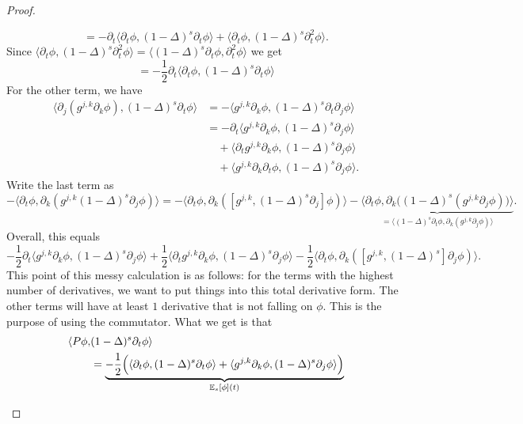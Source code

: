\begin{proof}
\begin{itemize}
\begin{itemize}
\[            = 
            -\partial_t \langle \partial_t \phi, (1-\Delta)^s \partial_t \phi    \rangle + \langle \partial_t \phi, (1-\Delta)^s \partial_t^2 \phi  \rangle . 
        \]
        Since $\langle \partial_t \phi, (1-\Delta)^s \partial_t^2 \phi \rangle = \langle (1-\Delta)^s \partial_t \phi, \partial_t^2 \phi \rangle$ we get 
        \[
            = -\frac{1}{2}\partial_t \langle \partial_t \phi, (1-\Delta)^s \partial_t \phi \rangle 
        \]  
        For the other term, we have 
        \begin{align*}
            \langle \partial_j(g^{j,k}\partial_k\phi), (1-\Delta)^s \partial_t \phi \rangle
            &= 
            - \langle g^{j,k}\partial_k \phi, (1-\Delta)^s \partial_t \partial_j \phi \rangle\\ 
            &= - \partial_t \langle g^{j,k}\partial_k \phi, (1-\Delta)^s \partial_j \phi \rangle  \\ 
            &\quad + \langle \partial_tg^{j,k}\partial_k \phi, (1-\Delta)^s \partial_j \phi \rangle   \\ 
            &\quad + \langle g^{j,k}\partial_k \partial_t \phi, (1-\Delta)^s \partial_j \phi \rangle. 
        \end{align*}
        Write the last term as 
        \[
            - \langle \partial_t \phi, \partial_k (g^{j,k}(1-\Delta)^s \partial_j \phi) \rangle  
            = 
            - \langle \partial_t \phi, \partial_k([g^{j,k}, (1-\Delta)^s \partial_j] \phi) \rangle  
            - 
            \underbrace{\langle \partial_t \phi, \partial_k \big( (1-\Delta)^s (g^{j,k}\partial_{j} \phi) \big) \rangle }_{= \langle (1-\Delta)^s \partial_t \phi, \partial_k (g^{j,k}\partial_j\phi) \rangle }. 
        \]
        Overall, this equals 
        \[
            -\frac{1}{2}\partial_t \langle g^{j,k}\partial_k \phi, (1-\Delta)^s \partial_j \phi \rangle + \frac{1}{2} \langle \partial_t g^{j,k}\partial_k \phi, (1-\Delta)^s \partial_j \phi \rangle - \frac{1}{2} \langle \partial_t \phi, \partial_k ([g^{j,k}, (1-\Delta)^s]\partial_j \phi) \rangle.   
        \]
        This point of this messy calculation is as follows: for the terms with the highest number of derivatives, we want to put things into this total derivative form. The other terms will have at least $1$ derivative that is not falling on $\phi$. This is the purpose of using the commutator. What we get is that 
        \begin{align*}
            \langle P \phi, &(1-\Delta)^s \partial_t \phi \rangle \\ 
            & = \underbrace{-\frac{1}{2}\Big( \langle \partial_t \phi, (1-\Delta)^s \partial_t \phi \rangle + \langle g^{j,k}\partial_k \phi, (1-\Delta)^s \partial_j \phi \rangle  \Big)}_{\EE_s [\phi](t)} \\ 

\end{align*}
\end{itemize}
\end{itemize}
\end{proof}
